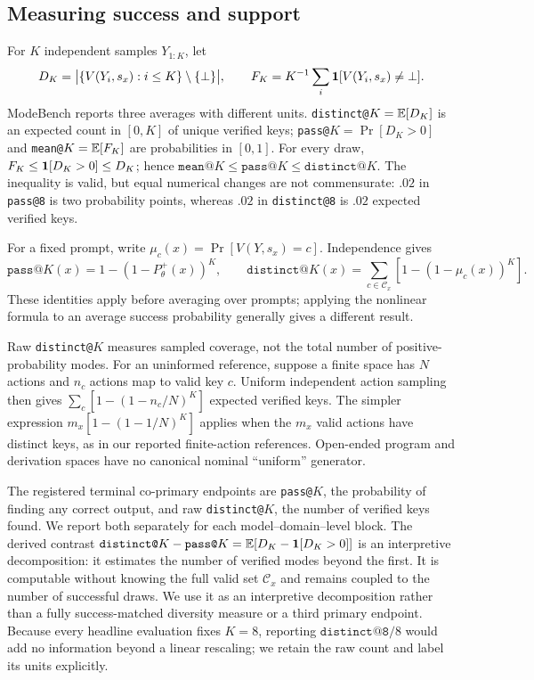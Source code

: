 \subsection{Measuring success and support}
\label{sec:collapse-metrics}

For $K$ independent samples $Y_{1:K}$, let
\[
  D_K=\bigl|\{V(Y_i,s_x):i\le K\}\setminus\{\bot\}\bigr|,
  \qquad
  F_K=K^{-1}\sum_i \mathbf 1[V(Y_i,s_x)\neq\bot].
\]
ModeBench reports three averages with different units. \texttt{distinct@}$K
=\mathbb E[D_K]$ is an expected count in $[0,K]$ of unique verified keys;
\texttt{pass@}$K=\Pr[D_K>0]$ and \texttt{mean@}$K=\mathbb E[F_K]$ are probabilities
in $[0,1]$. For every draw, $F_K\le\mathbf 1[D_K>0]\le D_K$; hence
$\texttt{mean@}K\le\texttt{pass@}K\le\texttt{distinct@}K$. The inequality is
valid, but equal numerical changes are not commensurate: $.02$ in
\texttt{pass@8} is two probability points, whereas $.02$ in
\texttt{distinct@8} is $.02$ expected verified keys.

For a fixed prompt, write $\mu_c(x)=\Pr[V(Y,s_x)=c]$. Independence gives
\[
 \texttt{pass@}K(x)=1-(1-P_\theta^+(x))^K,\qquad
 \texttt{distinct@}K(x)=\sum_{c\in\mathcal C_x}[1-(1-\mu_c(x))^K].
\]
These identities apply before averaging over prompts; applying the nonlinear
formula to an average success probability generally gives a different result.

Raw \texttt{distinct@}$K$ measures sampled coverage, not the total number of
positive-probability modes. For an uninformed reference, suppose a finite
space has $N$ actions and $n_c$ actions map to valid key $c$. Uniform independent
action sampling then gives $\sum_c[1-(1-n_c/N)^K]$ expected verified keys.
The simpler expression $m_x[1-(1-1/N)^K]$ applies when the $m_x$ valid actions
have distinct keys, as in our reported finite-action references.
Open-ended program and derivation spaces have no canonical nominal
``uniform'' generator.

The registered terminal co-primary endpoints are \texttt{pass@}$K$, the
probability of finding any correct output, and raw \texttt{distinct@}$K$, the
number of verified keys found. We report both separately for each
model--domain--level block. The derived contrast
$\texttt{distinct@}K-\texttt{pass@}K
=\mathbb E[D_K-\mathbf 1[D_K>0]]$ is an interpretive decomposition: it estimates the
number of verified modes beyond the first. It is computable without knowing the
full valid set $\mathcal C_x$ and remains coupled to the number of successful
draws. We use it as an interpretive decomposition rather than a fully
success-matched diversity measure or a third primary endpoint. Because every
headline evaluation fixes $K=8$, reporting $\texttt{distinct@8}/8$ would add no
information beyond a linear rescaling; we retain the raw count and label its
units explicitly.


